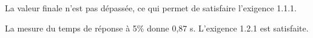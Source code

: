 \documentclass[10pt,fleqn]{article} %
\begin{document}
\begin{multicols}{2}
\begin{corrige}
La valeur finale n'est pas dépassée, ce qui permet de satisfaire l'exigence 1.1.1. 

La mesure du temps de réponse à 5\% donne 0,87 s. L'exigence 1.2.1 est satisfaite.
\end{corrige}
\else
\fi

\end{multicols}


\begin{center}
\end{center}
\end{document}
